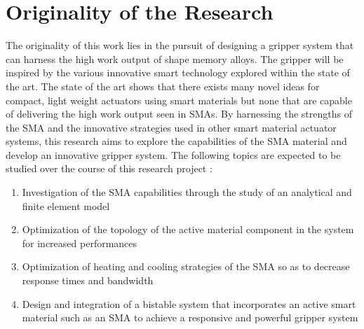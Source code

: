 \section{Originality of the Research} \label{sec:originality}
The originality of this work lies in the pursuit of designing a gripper system that can harness the high work output of shape memory alloys. The gripper will be inspired by the various innovative smart technology explored within the state of the art. The state of the art shows that there exists many novel ideas for compact, light weight actuators using smart materials but none that are capable of delivering the high work output seen in SMAs. By harnessing the strengths of the SMA and the innovative strategies used in other smart material actuator systems, this research aims to explore the capabilities of the SMA material and develop an innovative gripper system. The following topics are expected to be studied over the course of this research project :
\begin{enumerate}
  \item Investigation of the SMA capabilities through the study of an analytical and finite element model
  \item Optimization of the topology of the active material component in the system for increased performances
  \item Optimization of heating and cooling strategies of the SMA so as to decrease response times and bandwidth
  \item Design and integration of a bistable system that incorporates an active smart material such as an SMA to achieve a responsive and powerful gripper system
\end{enumerate}
